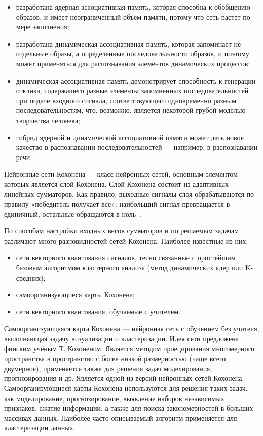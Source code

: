 \begin{itemize}
  \item разработана ядерная ассоциативная память, которая способна к обобщению образов, и имеет неограниченный объем памяти, потому что сеть растет по мере заполнения;
  \item разработана динамическая ассоциативная память, которая запоминает не отдельные образы, а определенные последовательности образов, и поэтому может применяться для распознавания элементов динамических процессов;
  \item динамическая ассоциативная память демонстрирует способность к генерации отклика, содержащего разные элементы запомненных последовательностей при подаче входного сигнала, соответствующего одновременно разным последовательностям, что, возможно, является некоторой грубой моделью творчества человека;
  \item гибрид ядерной и динамической ассоциативной памяти может дать новое качество в распознавании последовательностей — например, в распознавании речи.
\end{itemize}

Нейронные сети Кохонена --- класс нейронных сетей, основным элементом которых является слой Кохонена.
Слой Кохонена состоит из адаптивных линейных сумматоров.
Как правило, выходные сигналы слоя обрабатываются по правилу «победитель получает всё»: наибольший сигнал превращается в единичный, остальные обращаются в ноль~\cite{domain_kohonen}.

По способам настройки входных весов сумматоров и по решаемым задачам различают много разновидностей сетей Кохонена.
Наиболее известные из них:
\begin{itemize}
  \item сети векторного квантования сигналов, тесно связанные с простейшим базовым алгоритмом кластерного анализа (метод динамических ядер или K-средних);
  \item самоорганизующиеся карты Кохонена;
  \item сети векторного квантования, обучаемые с учителем.
\end{itemize}

Самоорганизующаяся карта Кохонена --- нейронная сеть с обучением без учителя, выполняющая задачу визуализации и кластеризации.
Идея сети предложена финским учёным Т. Кохоненом.
Является методом проецирования многомерного пространства в пространство с более низкой размерностью (чаще всего, двумерное), применяется также для решения задач моделирования, прогнозирования и др.
Является одной из версий нейронных сетей Кохонена.
Самоорганизующиеся карты Кохонена используются для решения таких задач, как моделирование, прогнозирование, выявление наборов независимых признаков, сжатие информации, а также для поиска закономерностей в больших массивах данных.
Наиболее часто описываемый алгоритм применяется для кластеризации данных.

